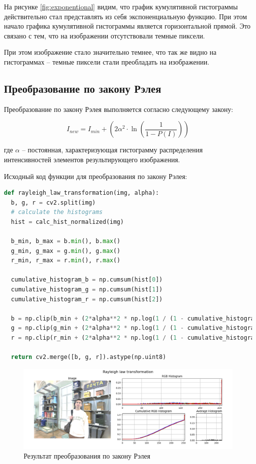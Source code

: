 На рисунке \ref{fig:exponentional} видим, что график кумулятивной гистограммы действительно стал представлять из себя экспоненциальную функцию. 
При этом начало графика кумулятивной гистограммы является горизонтальной прямой. Это связано с тем, что на изображении отсутствовали темные пиксели. 

При этом изображение стало значительно темнее, что так же видно на гистограммах -- темные пиксели стали преобладать на изображении.


\subsection{Преобразование по закону Рэлея}  

Преобразование по закону Рэлея выполняется согласно следующему закону:

\begin{equation}
  I_{new} = I_{min} + \left(2\alpha^2 \cdot \ln\left(\frac{1}{1 - P(I)}\right)\right)
\end{equation}

где $\alpha$ -- постоянная, характеризующая гистограмму распределения интенсивностей элементов результирующего изображения. 

Исходный код функции для преобразования по закону Рэлея:

\begin{lstlisting}[language=Python]
def rayleigh_law_transformation(img, alpha):
  b, g, r = cv2.split(img)
  # calculate the histograms
  hist = calc_hist_normalized(img)

  b_min, b_max = b.min(), b.max()
  g_min, g_max = g.min(), g.max()
  r_min, r_max = r.min(), r.max()

  cumulative_histogram_b = np.cumsum(hist[0]) 
  cumulative_histogram_g = np.cumsum(hist[1])
  cumulative_histogram_r = np.cumsum(hist[2])

  b = np.clip(b_min + (2*alpha**2 * np.log(1 / (1 - cumulative_histogram_b[b]))) ** 0.5 * 255, 0, 255)
  g = np.clip(g_min + (2*alpha**2 * np.log(1 / (1 - cumulative_histogram_g[g]))) ** 0.5 * 255, 0, 255)
  r = np.clip(r_min + (2*alpha**2 * np.log(1 / (1 - cumulative_histogram_r[r]))) ** 0.5 * 255, 0, 255)
  
  return cv2.merge([b, g, r]).astype(np.uint8)
\end{lstlisting}

\begin{figure}[H]
    \centering
    \includegraphics[width=\textwidth]{../results/Rayleigh law transformation.png}
    \caption{Результат преобразования по закону Рэлея}
    \label{fig:rayleigh}
\end{figure}

